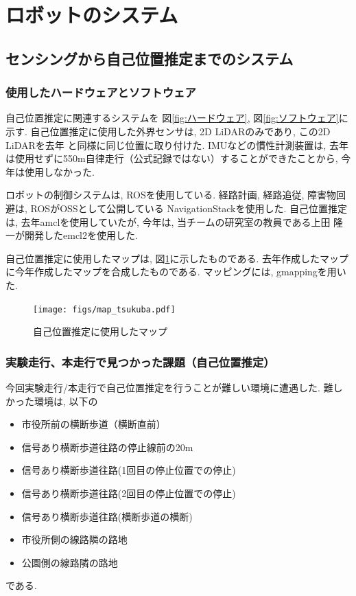\documentclass[twocolumn,9pt]{jsproceedings}
\begin{document}
\section{ロボットのシステム}

\subsection{センシングから自己位置推定までのシステム}

\subsubsection{使用したハードウェアとソフトウェア}

自己位置推定に関連するシステムを
図\ref{fig:ハードウェア}, 図\ref{fig:ソフトウェア}に示す. 
自己位置推定に使用した外界センサは, 2D LiDARのみであり,
この2D LiDARを去年\cite{去年のつくばチャレンジシンポジウム}
と同様に同じ位置に取り付けた.
IMUなどの慣性計測装置は, 去年は使用せずに550m自律走行（公式記録ではない）することができたことから, 
今年は使用しなかった. 

ロボットの制御システムは, ROSを使用している. 
経路計画, 経路追従, 障害物回避は, ROSがOSSとして公開している
NavigationStackを使用した. 
自己位置推定は, 去年amclを使用していたが, 
今年は, 当チームの研究室の教員である上田 隆一が開発したemcl2を使用した. 

自己位置推定に使用したマップは, 図\ref{fig:map_tsukuba}に示したものである.
去年作成したマップに今年作成したマップを合成したものである. マッピングには, gmappingを用いた. 

\begin{figure}[h]
  \begin{center}
    \texttt{[image: figs/map\_tsukuba.pdf]}
    \caption{自己位置推定に使用したマップ}
    \label{fig:map_tsukuba}
  \end{center}
\end{figure}

\subsubsection{実験走行、本走行で見つかった課題（自己位置推定）}

今回実験走行/本走行で自己位置推定を行うことが難しい環境に遭遇した. 
難しかった環境は, 以下の
\begin{itemize}
  \item 市役所前の横断歩道（横断直前）
  \item 信号あり横断歩道往路の停止線前の20m
  \item 信号あり横断歩道往路(1回目の停止位置での停止)
  \item 信号あり横断歩道往路(2回目の停止位置での停止)
  \item 信号あり横断歩道往路(横断歩道の横断)
  \item 市役所側の線路隣の路地
  \item 公園側の線路隣の路地
\end{itemize}
である. 
\end{document}
